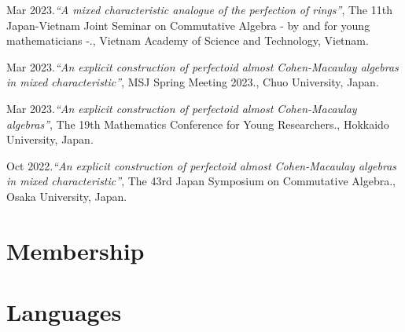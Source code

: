 \documentclass[10pt,a4paper,sans]{moderncv}
\begin{document}
\begin{etaremune}
  \item Mar 2023.\emph{``A mixed characteristic analogue of the perfection of rings''}, \textsf{The 11th Japan-Vietnam Joint Seminar on Commutative Algebra - by and for young mathematicians -.}, Vietnam Academy of Science and Technology, Vietnam.
  \item Mar 2023.\emph{``An explicit construction of perfectoid almost Cohen-Macaulay algebras in mixed characteristic''}, \textsf{MSJ Spring Meeting 2023.}, Chuo University, Japan.
  \item Mar 2023.\emph{``An explicit construction of perfectoid almost Cohen-Macaulay algebras''}, \textsf{The 19th Mathematics Conference for Young Researchers.}, Hokkaido University, Japan.
  \item Oct 2022.\emph{``An explicit construction of perfectoid almost Cohen-Macaulay algebras in mixed characteristic''}, \textsf{The 43rd Japan Symposium on Commutative Algebra.}, Osaka University, Japan.
\end{etaremune}


\section{Membership}


\section{Languages}





\end{document}
